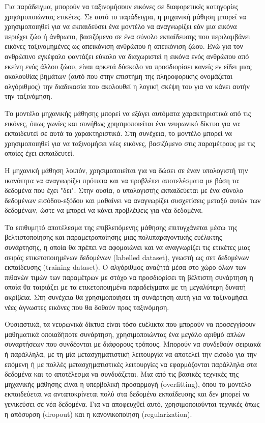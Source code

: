 {Για παράδειγμα, μπορούν να ταξινομήσουν εικόνες σε διαφορετικές κατηγορίες χρησιμοποιώντας ετικέτες. Σε αυτό το παράδειγμα, η μηχανική μάθηση μπορεί να χρησιμοποιηθεί για να εκπαιδεύσει ένα μοντέλο να αναγνωρίζει εάν μια εικόνα περιέχει ζώο ή άνθρωπο, βασιζόμενο σε ένα σύνολο εκπαίδευσης που περιλαμβάνει εικόνες ταξινομημένες ως απεικόνιση ανθρώπου ή απεικόνιση ζώου. Ενώ για τον ανθρώπινο εγκέφαλο φαντάζει εύκολο να διαχωριστεί η εικόνα ενός ανθρώπου από εκείνη ενός άλλου ζώου, είναι αρκετά δύσκολο να προσδιορίσει κανείς εν είδει μιας ακολουθίας βημάτων (αυτό που στην επιστήμη της πληροφορικής ονομάζεται αλγόριθμος) την διαδικασία που ακολουθεί η λογική σκέψη του για να κάνει αυτήν την ταξινόμηση. 

Το μοντέλο μηχανικής μάθησης μπορεί να εξάγει αυτόματα χαρακτηριστικά από τις εικόνες, όπως γωνίες και συνήθως χρησιμοποιείται ένα νευρωνικό δίκτυο για να εκπαιδευτεί σε αυτά τα χαρακτηριστικά. Στη συνέχεια, το μοντέλο μπορεί να χρησιμοποιηθεί για να ταξινομήσει νέες εικόνες, βασιζόμενο στις παραμέτρους με τις οποίες έχει εκπαιδευτεί.

Η μηχανική μάθηση λοιπόν, χρησιμοποιείται για να δώσει σε έναν υπολογιστή την ικανότητα να αναγνωρίζει πρότυπα και να προβλέπει αποτελέσματα με βάση τα δεδομένα που έχει "δει". Στην ουσία, ο υπολογιστής εκπαιδεύεται με ένα σύνολο δεδομένων εισόδου-εξόδου και μαθαίνει να αναγνωρίζει συσχετίσεις μεταξύ αυτών των δεδομένων, ώστε να μπορεί να κάνει προβλέψεις για νέα δεδομένα.

Το επιθυμητό αποτέλεσμα της επιβλεπόμενης μάθησης επιτυγχάνεται μέσω της βελτιστοποίησης και παραμετροποίησης μιας πολυπαραγοντικής ευέλικτης συνάρτησης, η οποία θα πρέπει να αφομοιώνει και να αναγνωρίζει τις ετικέτες μιας σειράς
ετικετοποιημένων δεδομένων (labelled dataset), γνωστή ως σετ δεδομένων εκπαίδευσης (training dataset). Ο αλγόριθμος αναζητά μέσα στο χώρο όλων των πιθανών τιμών των παραμέτρων με στόχο να προσδιορίσει τη βέλτιστη συνάρτηση η οποία θα ταιριάζει με τα ετικετοποιημένα παραδείγματα με τη μεγαλύτερη δυνατή ακρίβεια. Στη συνέχεια θα χρησιμοποιήσει τη συνάρτηση αυτή για να ταξινομήσει νέες άγνωστες εικόνες που θα δοθούν προς ταξινόμηση.

Ουσιαστικά, τα νευρωνικά δίκτυα είναι τόσο ευέλικτα που μπορούν να προσεγγίσουν μαθηματικά οποιαδήποτε συνάρτηση, χρησιμοποιώντας ένα μεγάλο αριθμό απλών συναρτήσεων που συνδέονται με διάφορους τρόπους. Μπορούν να συνδεθούν σειριακά ή παράλληλα, με τη μία μετασχηματιστική λειτουργία να αποτελεί την είσοδο για την επόμενη ή με πολλές μετασχηματιστικές λειτουργίες να εφαρμόζονται παράλληλα στα δεδομένα και το αποτέλεσμα να συνδυάζεται. Μια από τις βασικές τεχνικές της μηχανικής μάθησης είναι η υπερβολική προσαρμογή (overfitting), όπου το μοντέλο εκπαιδεύεται να ανταποκρίνεται πολύ στα δεδομένα εκπαίδευσης και δεν μπορεί να γενικεύσει σε νέα δεδομένα. Για να αποφευχθεί αυτό, χρησιμοποιούνται τεχνικές όπως η απόσυρση (dropout) και η κανονικοποίηση (regularization).

}
